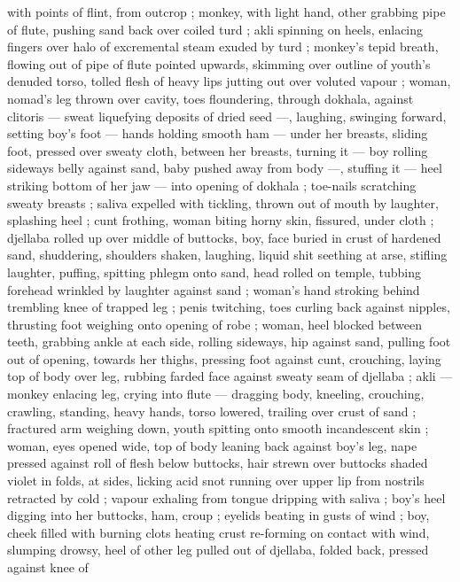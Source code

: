 with points of flint, from outcrop ; monkey, with light hand, other 
grabbing pipe of flute, pushing sand back over coiled turd ; akli 
spinning on heels, enlacing fingers over halo of excremental steam 
exuded by turd ; monkey's tepid breath, flowing out of pipe of flute 
pointed upwards, skimming over outline of youth's denuded torso, 
tolled flesh of heavy lips jutting out over voluted vapour ; woman, 
nomad's leg thrown over cavity, toes floundering, through dokhala, 
against clitoris --- sweat liquefying deposits of dried seed ---, 
laughing, swinging forward, setting boy's foot --- hands holding 
smooth ham --- under her breasts, sliding foot, pressed over sweaty 
cloth, between her breasts, turning it --- boy rolling sideways belly 
against sand, baby pushed away from body ---, stuffing it --- heel 
striking bottom of her jaw --- into opening of dokhala ; toe-nails 
scratching sweaty breasts ; saliva expelled with tickling, thrown out 
of mouth by laughter, splashing heel ; cunt frothing, woman biting 
horny skin, fissured, under cloth ; djellaba rolled up over middle of 
buttocks, boy, face buried in crust of hardened sand, shuddering, 
shoulders shaken, laughing, liquid shit seething at arse, stifling 
laughter, puffing, spitting phlegm onto sand, head rolled on temple, 
tubbing forehead wrinkled by laughter against sand ; woman's hand 
stroking behind trembling knee of trapped leg ; penis twitching, toes 
curling back against nipples, thrusting foot weighing onto opening of 
robe ; woman, heel blocked between teeth, grabbing ankle at each 
side, rolling sideways, hip against sand, pulling foot out of opening, 
towards her thighs, pressing foot against cunt, crouching, laying top 
of body over leg, rubbing farded face against sweaty seam of 
djellaba ; akli --- monkey enlacing leg, crying into flute --- dragging 
body, kneeling, crouching, crawling, standing, heavy hands, torso 
lowered, trailing over crust of sand ; fractured arm weighing down, 
youth spitting onto smooth incandescent skin ; woman, eyes opened 
wide, top of body leaning back against boy's leg, nape pressed 
against roll of flesh below buttocks, hair strewn over buttocks shaded 
violet in folds, at sides, licking acid snot running over upper lip from 
nostrils retracted by cold ; vapour exhaling from tongue dripping with 
saliva ; boy's heel digging into her buttocks, ham, croup ; eyelids 
beating in gusts of wind ; boy, cheek filled with burning clots heating 
crust re-forming on contact with wind, slumping drowsy, heel of other 
leg pulled out of djellaba, folded back, pressed against knee of 
